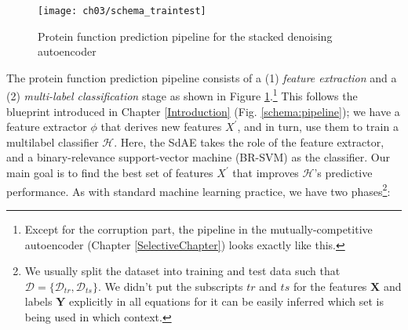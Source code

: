 \begin{figure}[!t]
  \centering
  \texttt{[image: ch03/schema\_traintest]}
  \caption[Protein function prediction pipeline]{Protein function prediction
  pipeline for the stacked denoising autoencoder}
  \label{schema:traintest_sdae}
\end{figure}

\par The protein function prediction pipeline consists of a (1) \textit{feature
extraction} and a (2) \textit{multi-label classification} stage as shown in
Figure \ref{schema:traintest_sdae}.\footnote{Except for the corruption part,
the pipeline in the mutually-competitive autoencoder (Chapter
\ref{SelectiveChapter}) looks exactly like this.} This follows the blueprint
introduced in Chapter \ref{Introduction} (Fig. \ref{schema:pipeline}); we
have a feature extractor $\phi$ that derives new features $X^{\prime}$, and
in turn, use them to train a multilabel classifier $\mathcal{H}$. Here, the SdAE
takes the role of the feature extractor, and a binary-relevance support-vector
machine (BR-SVM) as the classifier. Our main goal is to find the best set of
features $X^{\prime}$ that improves $\mathcal{H}$'s predictive performance.
As with standard machine learning practice, we have two phases\footnote{
  We usually split the dataset into training and test data such that
  $\mathcal{D} = \{\mathcal{D}_{tr}, \mathcal{D}_{ts}\}$. We didn't put the
  subscripts $tr$ and $ts$ for the features $\mathbf{X}$ and labels
  $\mathbf{Y}$ explicitly in all equations for it can be easily inferred
  which set is being used in which context.
}:

